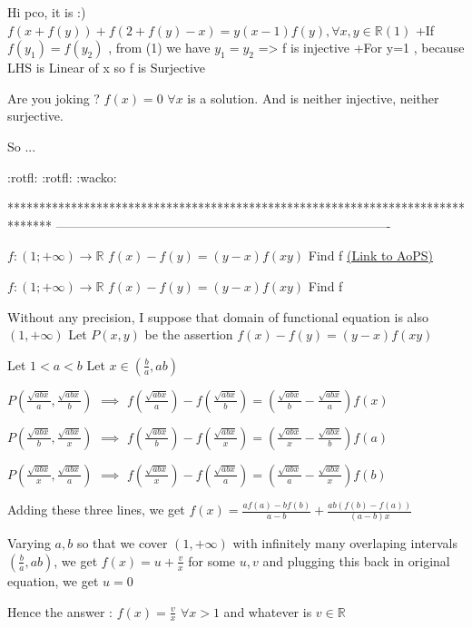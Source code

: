 \begin{solution}
	\begin{tcolorbox}Hi pco, it is :)
$ f(x+f(y))+f(2+f(y)-x)=y(x-1)f(y),\forall x,y\in\mathbb{R}(1) $
+If $ f(y_{1})=f(y_{2}) $ , from (1) we have $ y_{1}=y_{2} $ => f is injective
+For y=1 , because LHS is Linear of x so f is Surjective\end{tcolorbox}
Are you joking ?
$f(x)=0$ $\forall x$ is a solution.
And is neither injective, neither surjective.

So ...
\end{solution}



\begin{solution}
	 :rotfl:  :rotfl:  :wacko: 
\end{solution}
*******************************************************************************
-------------------------------------------------------------------------------

\begin{problem}
	$ f:(1;+\infty) \to \mathbb{R} $
$f(x)-f(y)=(y-x)f(xy)$
Find f
	\flushright \href{https://artofproblemsolving.com/community/c6h605874}{(Link to AoPS)}
\end{problem}



\begin{solution}
	\begin{tcolorbox}$ f:(1;+\infty) \to \mathbb{R} $
$f(x)-f(y)=(y-x)f(xy)$
Find f\end{tcolorbox}
Without any precision, I suppose that domain of functional equation is also $(1,+\infty)$
Let $P(x,y)$ be the assertion $f(x)-f(y)=(y-x)f(xy)$

Let $1<a<b$
Let $x\in(\frac ba,ab)$

$P(\frac{\sqrt{abx}}a,\frac{\sqrt{abx}}b)$ $\implies$ $f(\frac{\sqrt{abx}}a)-f(\frac{\sqrt{abx}}b)=(\frac{\sqrt{abx}}b-\frac{\sqrt{abx}}a)f(x)$

$P(\frac{\sqrt{abx}}b,\frac{\sqrt{abx}}x)$ $\implies$ $f(\frac{\sqrt{abx}}b)-f(\frac{\sqrt{abx}}x)=(\frac{\sqrt{abx}}x-\frac{\sqrt{abx}}b)f(a)$

$P(\frac{\sqrt{abx}}x,\frac{\sqrt{abx}}a)$ $\implies$ $f(\frac{\sqrt{abx}}x)-f(\frac{\sqrt{abx}}a)=(\frac{\sqrt{abx}}a-\frac{\sqrt{abx}}x)f(b)$

Adding these three lines, we get $f(x)=\frac{af(a)-bf(b)}{a-b}+\frac{ab(f(b)-f(a))}{(a-b)x}$ 

Varying $a,b$ so that we cover $(1,+\infty)$ with infinitely many overlaping intervals $(\frac ba,ab)$, we get ${f(x)=u+\frac vx}$ for some $u,v$ and plugging this back in original equation, we get $u=0$

Hence the answer : $\boxed{f(x)=\frac vx}$ $\forall x>1$ and whatever is $v\in\mathbb R$
\end{solution}



